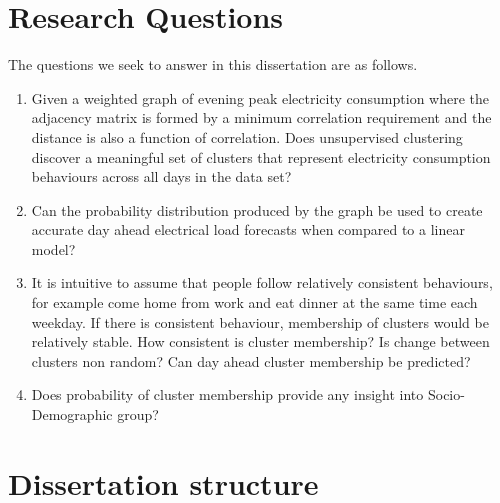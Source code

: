 \section{Research Questions}
The questions we seek to answer in this dissertation are as follows.
\begin{enumerate}
\itemsep0em 
    \item Given a weighted graph of evening peak electricity consumption where the adjacency matrix is formed by a minimum correlation requirement and the distance is also a function of correlation. Does unsupervised clustering discover a meaningful set of clusters that represent electricity consumption behaviours across all days in the data set?
    
    \item Can the probability distribution produced by the graph be used to create accurate day ahead electrical load forecasts when compared to a linear model?
    
    \item It is intuitive to assume that people follow relatively consistent behaviours, for example come home from work and eat dinner at the same time each weekday. If there is consistent behaviour, membership of clusters would be relatively stable. How consistent is cluster membership? Is change between clusters non random? Can day ahead cluster membership be predicted?

    \item Does probability of cluster membership provide any insight into Socio-Demographic group?
\end{enumerate}


\section{Dissertation structure}

